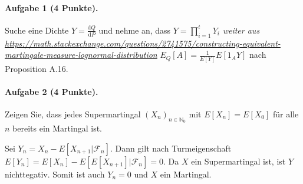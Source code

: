 \documentclass{article}
\begin{document}
\paragraph{Aufgabe 1 \textnormal{(4 Punkte)}.}

Suche eine Dichte $Y=\frac{\mathrm{d}Q}{\mathrm{d}P}$ und nehme an, dass $Y=\prod_{i=1}^t Y_i$
\emph{weiter aus \url{https://math.stackexchange.com/questions/2741575/constructing-equivalent-martingale-measure-lognormal-distribution}}
$E_Q[A]=\frac{1}{E[Y]}E[1_A Y]$ nach Proposition A.16.
\paragraph{Aufgabe 2 \textnormal{(4 Punkte)}.}
Zeigen Sie, dass jedes Supermartingal $(X_n)_{n\in\mathbb{N}_0}$ mit $E[X_n]=E[X_0]$ für alle $n$ bereits ein Martingal ist.

Sei $Y_n=X_n-E[X_{n+1}|\mathscr{F}_n]$.
Dann gilt nach Turmeigenschaft $E[Y_n]=E[X_n]-E[E[X_{n+1}]|\mathscr{F}_n]=0$.
Da $X$ ein Supermartingal ist, ist $Y$ nichttegativ.
Somit ist auch $Y_n=0$ und $X$ ein Martingal.

\end{document}
